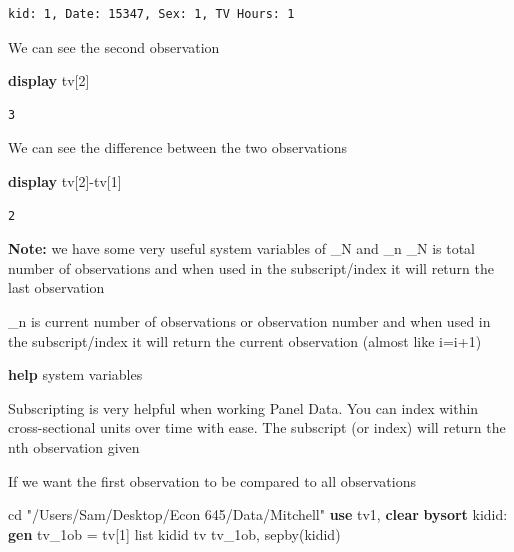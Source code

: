 \documentclass[
]{book}
\newenvironment{Shaded}{\begin{snugshade}}{\end{snugshade}}
\newcommand{\KeywordTok}[1]{\textcolor[rgb]{0.13,0.29,0.53}{\textbf{#1}}}
\newcommand{\NormalTok}[1]{#1}
\newcommand{\OtherTok}[1]{\textcolor[rgb]{0.56,0.35,0.01}{#1}}
\newcommand{\StringTok}[1]{\textcolor[rgb]{0.31,0.60,0.02}{#1}}
\begin{document}
\begin{verbatim}
kid: 1, Date: 15347, Sex: 1, TV Hours: 1
\end{verbatim}

We can see the second observation

\begin{Shaded}
\begin{Highlighting}[]
\KeywordTok{display}\NormalTok{ tv[2]}
\end{Highlighting}
\end{Shaded}

\begin{verbatim}
3
\end{verbatim}

We can see the difference between the two observations

\begin{Shaded}
\begin{Highlighting}[]
\KeywordTok{display}\NormalTok{ tv[2]{-}tv[1]}
\end{Highlighting}
\end{Shaded}

\begin{verbatim}
2
\end{verbatim}

\textbf{Note:} we have some very useful system variables of \_N and \_n
\_N is total number of observations and when used in the subscript/index
it will return the last observation

\_n is current number of observations or observation number and when used in
the subscript/index it will return the current observation (almost like i=i+1)

\begin{Shaded}
\begin{Highlighting}[]
\KeywordTok{help}\NormalTok{ system variables}
\end{Highlighting}
\end{Shaded}

Subscripting is very helpful when working Panel Data. You can index within
cross-sectional units over time with ease. The subscript (or index) will
return the nth observation given

If we want the first observation to be compared to all observations

\begin{Shaded}
\begin{Highlighting}[]
\NormalTok{cd }\StringTok{"/Users/Sam/Desktop/Econ 645/Data/Mitchell"}
\KeywordTok{use}\NormalTok{ tv1, }\KeywordTok{clear}
\KeywordTok{bysort}\NormalTok{ kidid: }\KeywordTok{gen}\NormalTok{ tv\_1ob = tv[1]}
\OtherTok{list}\NormalTok{ kidid tv tv\_1ob, sepby(kidid)}
\end{Highlighting}
\end{Shaded}
\end{document}

